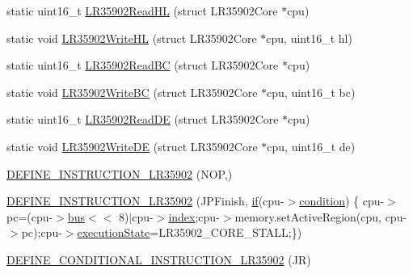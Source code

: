 \begin{DoxyCompactItemize}
\item 
static uint16\+\_\+t \mbox{\hyperlink{isa-lr35902_8c_a2aecac31902540d73a813542994471ff}{L\+R35902\+Read\+HL}} (struct L\+R35902\+Core $\ast$cpu)
\item 
static void \mbox{\hyperlink{isa-lr35902_8c_a0691f1803bdb66cce0e40c352c6845d8}{L\+R35902\+Write\+HL}} (struct L\+R35902\+Core $\ast$cpu, uint16\+\_\+t hl)
\item 
static uint16\+\_\+t \mbox{\hyperlink{isa-lr35902_8c_a9592cbd56d4f66bab66a74e70a335023}{L\+R35902\+Read\+BC}} (struct L\+R35902\+Core $\ast$cpu)
\item 
static void \mbox{\hyperlink{isa-lr35902_8c_a9993dc80da8aefaddc1835acce7fb30b}{L\+R35902\+Write\+BC}} (struct L\+R35902\+Core $\ast$cpu, uint16\+\_\+t bc)
\item 
static uint16\+\_\+t \mbox{\hyperlink{isa-lr35902_8c_a59a8dd63f3535192f0f9512a3ad09596}{L\+R35902\+Read\+DE}} (struct L\+R35902\+Core $\ast$cpu)
\item 
static void \mbox{\hyperlink{isa-lr35902_8c_a5fa5d9a2681a7f9e0fa3d2184a1291e4}{L\+R35902\+Write\+DE}} (struct L\+R35902\+Core $\ast$cpu, uint16\+\_\+t de)
\item 
\mbox{\hyperlink{isa-lr35902_8c_a2efd8c5d8c23895f6f97b0845b5298b3}{D\+E\+F\+I\+N\+E\+\_\+\+I\+N\+S\+T\+R\+U\+C\+T\+I\+O\+N\+\_\+\+L\+R35902}} (N\+OP,)
\item 
\mbox{\hyperlink{isa-lr35902_8c_a673d4e12218fe00bca748e65b3d4d025}{D\+E\+F\+I\+N\+E\+\_\+\+I\+N\+S\+T\+R\+U\+C\+T\+I\+O\+N\+\_\+\+L\+R35902}} (J\+P\+Finish, \mbox{\hyperlink{isa-lr35902_8c_a2eb27369cb3dbac14564f95cd51effdf}{if}}(cpu-\/$>$\mbox{\hyperlink{isa-lr35902_8c_a9cc5e499f71726f3a653debd7bf9ccc7}{condition}}) \{ cpu-\/$>$pc=(cpu-\/$>$\mbox{\hyperlink{isa-lr35902_8c_a6163e7e073b87ad067db0a3b10da6be9}{bus}}$<$$<$ 8)$\vert$cpu-\/$>$\mbox{\hyperlink{isa-lr35902_8c_ac9ee548085af12859cb52a6c757cf73a}{index}};cpu-\/$>$memory.\+set\+Active\+Region(cpu, cpu-\/$>$pc);cpu-\/$>$\mbox{\hyperlink{isa-lr35902_8c_a087a53d4d283226a73c530dd2883d634}{execution\+State}}=L\+R35902\+\_\+\+C\+O\+R\+E\+\_\+\+S\+T\+A\+LL;\})
\item 
\mbox{\hyperlink{isa-lr35902_8c_a81821d36c88ae028c1672d0ca823fd38}{D\+E\+F\+I\+N\+E\+\_\+\+C\+O\+N\+D\+I\+T\+I\+O\+N\+A\+L\+\_\+\+I\+N\+S\+T\+R\+U\+C\+T\+I\+O\+N\+\_\+\+L\+R35902}} (JR)
\item 
$$
\end{DoxyCompactItemize}
